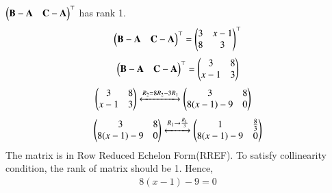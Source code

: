 \documentclass[journal,12pt,onecolumn]{IEEEtran}
\theoremstyle{remark}
\begin{document}
$\begin{pmatrix} \mathbf{B}-\mathbf{A} & \mathbf{C}-\mathbf{A} \end{pmatrix}^\top$ has rank 1.
\begin{align}
\begin{pmatrix} \mathbf{B}-\mathbf{A} & \mathbf{C}-\mathbf{A} \end{pmatrix}^\top = \begin{pmatrix}3&x-1\\8&3\end{pmatrix}^\top
\end{align}
\begin{align}
\begin{pmatrix} \mathbf{B}-\mathbf{A} & \mathbf{C}-\mathbf{A} \end{pmatrix}^\top = \begin{pmatrix}3&8\\x-1&3\end{pmatrix}
\end{align}
\begin{align}
\begin{pmatrix}3&8\\x-1&3\end{pmatrix}
 &\xleftrightarrow{R_2 = 8R_2 - 3R_1}
 \begin{pmatrix}3&8\\8(x-1)-9&0\end{pmatrix}
\end{align}
\begin{align}
\begin{pmatrix}3&8\\8(x-1)-9&0\end{pmatrix}\xleftrightarrow{R_{1}\rightarrow\frac{R_{1}}{3}}\begin{pmatrix}1&\frac{8}{3}\\8(x-1)-9&0\end{pmatrix}
\end{align}
The matrix is in Row Reduced Echelon Form(RREF). To satisfy collinearity condition, the rank of matrix should be 1. Hence,
\begin{align}
    8(x-1)-9 = 0
\end{align}
\end{document}
